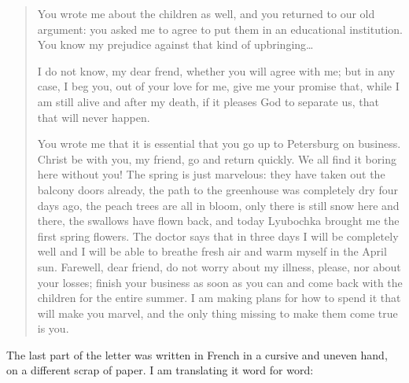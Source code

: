 \begin{quotation}
You wrote me about the children as well, and you returned to our old argument: you asked me to agree to put them in an educational institution. You know my prejudice against that kind of upbringing\ldots{}

I do not know, my dear frend, whether you will agree with me; but in any case, I beg you, out of your love for me, give me your promise that, while I am still alive and after my death, if it pleases God to separate us, that that will never happen.

You wrote me that it is essential that you go up to Petersburg on business. Christ be with you, my friend, go and return quickly. We all find it boring here without you! The spring is just marvelous: they have taken out the balcony doors already, the path to the greenhouse was completely dry four days ago, the peach trees are all in bloom, only there is still snow here and there, the swallows have flown back, and today Lyubochka brought me the first spring flowers. The doctor says that in three days I will be completely well and I will be able to breathe fresh air and warm myself in the April sun. Farewell, dear friend, do not worry about my illness, please, nor about your losses; finish your business as soon as you can and come back with the children for the entire summer. I am making plans for how to spend it that will make you marvel, and the only thing missing to make them come true is you.
\end{quotation}

The last part of the letter was written in French in a cursive and uneven hand, on a different scrap of paper. I am translating it word for word:

